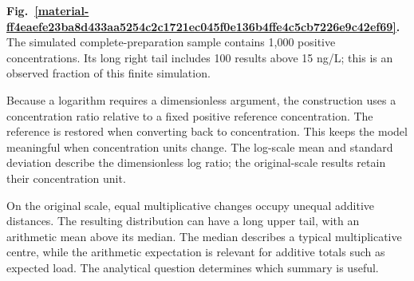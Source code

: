 \documentclass[11pt,a4paper]{article}
\begin{document}
\par\medskip
\Needspace{10cm}
\label{material-ff4eaefe23ba8d433aa5254c2c1721ec045f0e136b4ffe4c5cb7226e9c42ef69}
\noindent\textbf{Fig.~\ref*{material-ff4eaefe23ba8d433aa5254c2c1721ec045f0e136b4ffe4c5cb7226e9c42ef69}.} The simulated complete-preparation sample contains 1,000 positive concentrations. Its long right tail includes 100 results above 15 ng/L; this is an observed fraction of this finite simulation.\par\nopagebreak
\begin{center}
\end{center}

\medskip

Because a logarithm requires a dimensionless argument, the construction uses a concentration ratio relative to a fixed positive reference concentration. The reference is restored when converting back to concentration. This keeps the model meaningful when concentration units change. The log-scale mean and standard deviation describe the dimensionless log ratio; the original-scale results retain their concentration unit.


On the original scale, equal multiplicative changes occupy unequal additive distances. The resulting distribution can have a long upper tail, with an arithmetic mean above its median. The median describes a typical multiplicative centre, while the arithmetic expectation is relevant for additive totals such as expected load. The analytical question determines which summary is useful.
\end{document}
